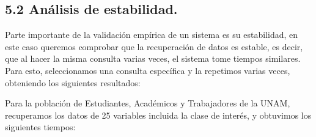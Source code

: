 \documentclass[
 12pt,
 letterpaper,
]{article}
\theoremstyle{teoremaBreak}
\theoremstyle{plain}
\theoremstyle{definition}
\begin{document}
\subsection{5.2 Análisis de estabilidad.}\label{5.2-análisis-de-estabilidad-estadística.}

Parte importante de la validación empírica de un sistema es su estabilidad, en este caso queremos comprobar que la recuperación 
de datos es estable, es decir, que al hacer la misma consulta varias veces, el sistema tome tiempos similares.
Para esto, seleccionamos una consulta específica y la repetimos varias veces, obteniendo los siguientes resultados:

Para la población de Estudiantes, Académicos y Trabajadores de la UNAM, recuperamos los datos de 25 variables incluida 
la clase de interés, y obtuvimos los siguientes tiempos:
\end{document}
